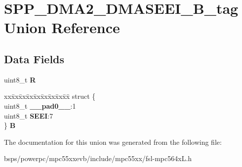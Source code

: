 \hypertarget{unionSPP__DMA2__DMASEEI__8B__tag}{}\section{S\+P\+P\+\_\+\+D\+M\+A2\+\_\+\+D\+M\+A\+S\+E\+E\+I\+\_\+B\+\_\+tag Union Reference}
\label{unionSPP__DMA2__DMASEEI__8B__tag}
\subsection*{Data Fields}
\begin{DoxyCompactItemize}
\item 
\mbox{\label{unionSPP__DMA2__DMASEEI__8B__tag_a5fb6eff9ecd84be491659210d6dc73fc}} 
uint8\+\_\+t {\bfseries R}
\item 
\mbox{\label{unionSPP__DMA2__DMASEEI__8B__tag_acb26d9ce45638618248f4dc7a1b7eeed}} 
\begin{tabbing}
xx\=xx\=xx\=xx\=xx\=xx\=xx\=xx\=xx\=\kill
struct \{\\
\>uint8\_t {\bfseries \_\_pad0\_\_}:1\\
\>uint8\_t {\bfseries SEEI}:7\\
\} {\bfseries B}\\

\end{tabbing}\end{DoxyCompactItemize}


The documentation for this union was generated from the following file\+:\begin{DoxyCompactItemize}
\item 
bsps/powerpc/mpc55xxevb/include/mpc55xx/fsl-\/mpc564x\+L.\+h\end{DoxyCompactItemize}

